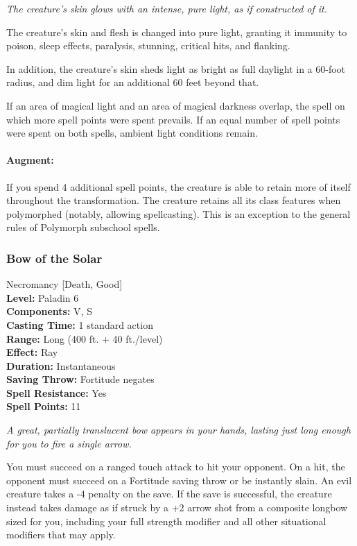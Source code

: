 \emph{The creature's skin glows with an intense, pure light, as if constructed of it.}

The creature's skin and flesh is changed into pure light, granting it immunity to poison, sleep effects, paralysis, stunning, critical hits, and flanking.

In addition, the creature's skin sheds light as bright as full daylight in a 60-foot radius, and dim light for an additional 60 feet beyond that. 

If an area of magical light and an area of magical darkness overlap, 
the spell on which more spell points were spent prevails.
If an equal number of spell points were spent on both spells, ambient light conditions remain.

\paragraph{Augment:} If you spend 4 additional spell points, the creature is able to retain more of itself throughout the transformation.
The creature retains all its class features when polymorphed (notably, allowing spellcasting).
This is an exception to the general rules of Polymorph subschool spells.
\subsubsection{Bow of the Solar}
\label{Spell:BowOfTheSolar}
Necromancy [Death, Good]
\\ \textbf{Level:} Paladin 6
\\ \textbf{Components:} V, S
\\ \textbf{Casting Time:} 1 standard action
\\ \textbf{Range:} Long (400 ft. + 40 ft./level)
\\ \textbf{Effect:} Ray
\\ \textbf{Duration:} Instantaneous
\\ \textbf{Saving Throw:} Fortitude negates
\\ \textbf{Spell Resistance:} Yes
\\ \textbf{Spell Points:} 11

\emph{A great, partially translucent bow appears in your hands, lasting just long enough for you to fire a single arrow.}

You must succeed on a ranged touch attack to hit your opponent.
On a hit, the opponent must succeed on a Fortitude saving throw or be instantly slain.
An evil creature takes a -4 penalty on the save.
If the save is successful, the creature instead takes damage as if struck by a +2 arrow shot from a composite longbow sized for you, including your full strength modifier and all other situational modifiers that may apply.

